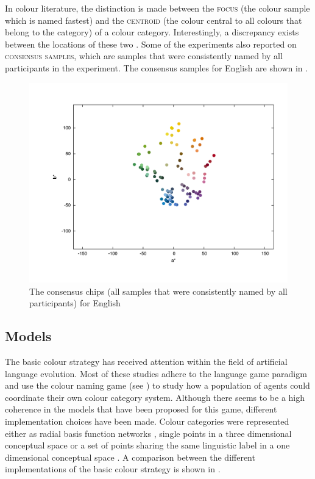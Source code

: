In colour literature, the distinction is made between the \textsc{focus}
(the colour sample which is named fastest) and the \textsc{centroid}
(the colour central to all colours that belong to the category) of a
colour category. Interestingly, a discrepancy exists between the
locations of these two \citep{sturges95location}. Some of the
experiments also reported on \textsc{consensus samples}, which are samples that were
consistently named by all participants in the experiment. The
consensus samples for English \citep{sturges95location} are shown in
.

\begin{figure}[htbp]
  \begin{center}
    \includegraphics[width=.8\textwidth]{./basic-strategy/figures/sturges-consensus-chips.pdf}
    \caption[Consensus chips for English]{The consensus chips (all
      samples that were consistently named by all participants) for
      English \citep{sturges95location}}
    \label{f:basic-consensus-chips-english}
  \end{center}
\end{figure}

\subsection{Models}

The basic colour strategy has received attention
within the field of artificial language evolution. Most of these
studies adhere to the language game paradigm and use the colour
naming game (see ) to study
how a population of agents could coordinate their own colour category
system. Although there seems to be a high coherence in the models that
have been proposed for this game, different implementation choices
have been made. Colour categories were represented either as radial
basis function networks \citep{steels05coordinating}, single points in
a three dimensional conceptual space \citep{belpaeme05explaining,
  belpaeme07language} or a set of points sharing the same linguistic
label in a one dimensional conceptual space \citep{puglisi08cultural,
  baronchelli10modeling}. A comparison between the different
implementations of the basic colour strategy is shown in .


